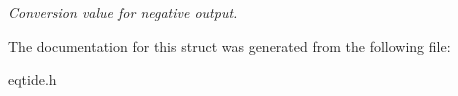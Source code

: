 \begin{DoxyCompactItemize}
\begin{DoxyCompactList}\small\item\em Conversion value for negative output. \end{DoxyCompactList}\end{DoxyCompactItemize}


The documentation for this struct was generated from the following file\+:\begin{DoxyCompactItemize}
\item 
eqtide.\+h\end{DoxyCompactItemize}
